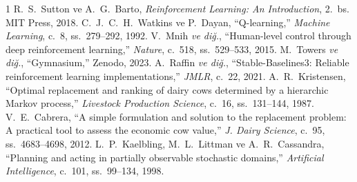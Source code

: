 \documentclass[conference]{IEEEtran}
\begin{document}
\begin{thebibliography}{1}
 R.~S.~Sutton ve A.~G.~Barto, \emph{Reinforcement Learning: An Introduction}, 2.~bs. MIT Press, 2018.
 C.~J.~C.~H.~Watkins ve P.~Dayan, ``Q-learning,'' \emph{Machine Learning}, c.~8, ss.~279--292, 1992.
 V.~Mnih \emph{ve di\u{g}.}, ``Human-level control through deep reinforcement learning,'' \emph{Nature}, c.~518, ss.~529--533, 2015.
 M.~Towers \emph{ve di\u{g}.}, ``Gymnasium,'' Zenodo, 2023.
 A.~Raffin \emph{ve di\u{g}.}, ``Stable-Baselines3: Reliable reinforcement learning implementations,'' \emph{JMLR}, c.~22, 2021.
 A.~R.~Kristensen, ``Optimal replacement and ranking of dairy cows determined by a hierarchic Markov process,'' \emph{Livestock Production Science}, c.~16, ss.~131--144, 1987.
 V.~E.~Cabrera, ``A simple formulation and solution to the replacement problem: A practical tool to assess the economic cow value,'' \emph{J. Dairy Science}, c.~95, ss.~4683--4698, 2012.
 L.~P.~Kaelbling, M.~L.~Littman ve A.~R.~Cassandra, ``Planning and acting in partially observable stochastic domains,'' \emph{Artificial Intelligence}, c.~101, ss.~99--134, 1998.
\end{thebibliography}
\end{document}
